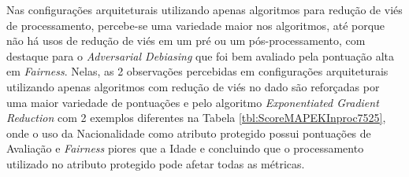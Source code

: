 \documentclass[Portugues,Final]{ic-tese-v3}
\begin{document}
Nas configurações arquiteturais utilizando apenas algoritmos para redução de viés de processamento, percebe-se uma variedade maior nos algoritmos, até porque não há usos de redução de viés em um pré ou um pós-processamento, com destaque para o \textit{Adversarial Debiasing} que foi bem avaliado pela pontuação alta em \textit{Fairness}. Nelas, as 2 observações percebidas em configurações arquiteturais utilizando apenas algoritmos com redução de viés no dado são reforçadas por uma maior variedade de pontuações e pelo algoritmo \textit{Exponentiated Gradient Reduction} com 2 exemplos diferentes na Tabela \ref{tbl:ScoreMAPEKInproc7525}, onde o uso da Nacionalidade como atributo protegido possui pontuações de Avaliação e \textit{Fairness} piores que a Idade e concluindo que o processamento utilizado no atributo protegido pode afetar todas as métricas.

\begin{table}[H]
\begin{center}
  \caption{Melhores configurações escolhidas pelo Gerenciador Autonômico \\ Algoritmos para redução de viés de pós-processamento - 50\% Avaliação/50\% \textit{Fairness}}
\label{tbl:ScoreMAPEKPostproc5050}
\end{center}
\end{table}
\end{document}
